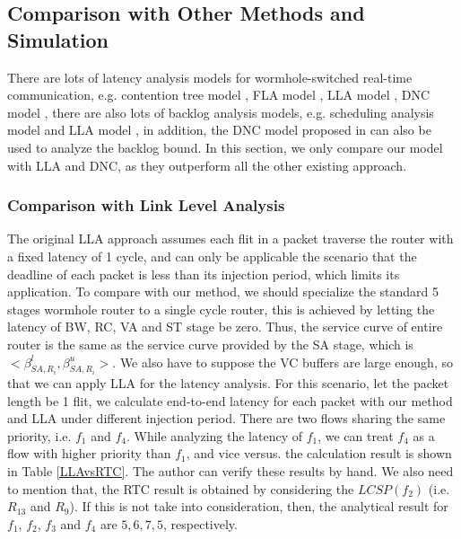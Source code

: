 \documentclass[10pt,journal]{IEEEtran}
\begin{document}
\subsection{Comparison with Other Methods and Simulation}
There are lots of latency analysis models for wormhole-switched real-time communication, e.g. contention tree model \cite{LuJS05}, FLA model \cite{Shi:2008:RCA:1397757.1397996}, LLA model \cite{73}, DNC model \cite{Qian489900}, there are also lots of backlog analysis models, e.g. scheduling analysis model \cite{Manolache:2006:BSO:1131481.1131683} and LLA model \cite{189}, in addition, the DNC model proposed in \cite{Qian489900} can also be used to analyze the backlog bound. In this section, we only compare our model with LLA and DNC, as they outperform all the other existing approach.

\subsubsection{Comparison with Link Level Analysis}
The original LLA approach assumes each flit in a packet traverse the router with a fixed latency of 1 cycle, and can only be applicable the scenario that the deadline of each packet is less than its injection period, which limits its application. To compare with our method, we should specialize the standard 5 stages wormhole router to a single cycle router, this is achieved by letting the latency of BW, RC, VA and ST stage be zero. Thus, the service curve of entire router is the same as the service curve provided by the SA stage, which is $<\beta_{SA,R_i}^l,\beta_{SA,R_i}^u>$. We also have to suppose the VC buffers are large enough, so that we can apply LLA for the latency analysis. For this scenario, let the packet length be 1 flit, we calculate end-to-end latency for each packet with our method and LLA under different injection period. There are two flows sharing the same priority, i.e. $f_1$ and $f_4$. While analyzing the latency of $f_1$, we can treat $f_4$ as a flow with higher priority than $f_1$, and vice versus. the calculation result is shown in Table \ref{LLAvsRTC}. The author can verify these results by hand. We also need to mention that, the RTC result is obtained by considering the $LCSP(f_2)$ (i.e. $R_{13}$ and $R_{9}$). If this is not take into consideration, then, the analytical result for $f_1$, $f_2$, $f_3$ and $f_4$ are $5,6,7,5$, respectively.
\end{document}
